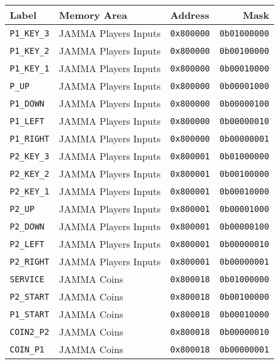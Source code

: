 \begin{tabularx}{\textwidth}{Xllr}
  \toprule    
  \textbf{Label } & \textbf{ Memory Area }  & \textbf{Address } & \textbf{Mask } \\               
  \toprule   
  
    \texttt{P1\_KEY\_3} & JAMMA Players Inputs &    \texttt{0x800000} &  \texttt{0b01000000}    \\ 
      \texttt{P1\_KEY\_2} & JAMMA Players Inputs &  \texttt{0x800000} &  \texttt{0b00100000}    \\  	
    \texttt{P1\_KEY\_1} & JAMMA Players Inputs &    \texttt{0x800000} &  \texttt{0b00010000}    \\     
  \texttt{P\_UP}    & JAMMA Players Inputs &        \texttt{0x800000} &  \texttt{0b00001000}    \\     
  \texttt{P1\_DOWN} & JAMMA Players Inputs &  \texttt{0x800000} &  \texttt{0b00000100}    \\     
  \texttt{P1\_LEFT} & JAMMA Players Inputs &  \texttt{0x800000} &  \texttt{0b00000010}    \\     
  \texttt{P1\_RIGHT} & JAMMA Players Inputs &  \texttt{0x800000} &  \texttt{0b00000001}    \\     
 
  \toprule   
    \texttt{P2\_KEY\_3} & JAMMA Players Inputs &  \texttt{0x800001}    &  \texttt{0b01000000}    \\     
  \texttt{P2\_KEY\_2} & JAMMA Players Inputs &  \texttt{0x800001}    &    \texttt{0b00100000}    \\     
  \texttt{P2\_KEY\_1} & JAMMA Players Inputs &  \texttt{0x800001}    &    \texttt{0b00010000}    \\    
  \texttt{P2\_UP}    & JAMMA Players Inputs &  \texttt{0x800001}    &     \texttt{0b00001000}    \\     
  \texttt{P2\_DOWN} & JAMMA Players Inputs &  \texttt{0x800001}    &      \texttt{0b00000100}    \\     
  \texttt{P2\_LEFT} & JAMMA Players Inputs &  \texttt{0x800001}    &      \texttt{0b00000010}    \\     
  \texttt{P2\_RIGHT} & JAMMA Players Inputs &  \texttt{0x800001}    &     \texttt{0b00000001}    \\     

  \toprule   
  \texttt{SERVICE} & JAMMA Coins &  \texttt{0x800018}       &     \texttt{0b01000000}    \\ 
   \texttt{P2\_START} & JAMMA Coins &  \texttt{0x800018}   &      \texttt{0b00100000}    \\ 
   \texttt{P1\_START} & JAMMA Coins &  \texttt{0x800018}   &      \texttt{0b00010000}    \\   
     \texttt{COIN2\_P2} & JAMMA Coins &  \texttt{0x800018}    &   \texttt{0b00000010}    \\  
   \texttt{COIN\_P1} & JAMMA Coins &  \texttt{0x800018}       &   \texttt{0b00000001}    \\      
     


\end{tabularx}
